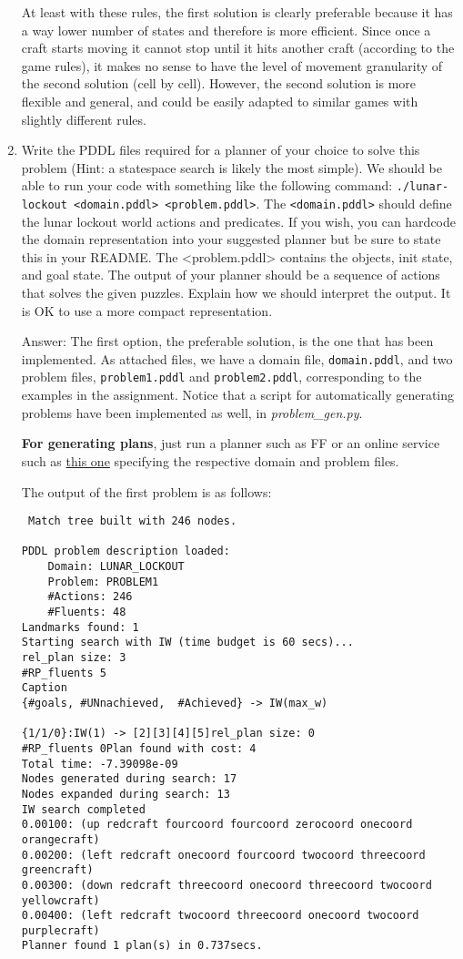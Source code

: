 \documentclass{article}
\begin{document}
\begin{enumerate}
At least with these rules, the first solution is clearly preferable because it has a way lower number of states and therefore is more efficient. Since once a craft starts moving it cannot stop until it hits another craft (according to the game rules), it makes no sense to have the level of movement granularity of the second solution (cell by cell). However, the second solution is more flexible and general, and could be easily adapted to similar games with slightly different rules.

\item
Write the PDDL files required for a planner of your choice to solve this problem (Hint: a statespace search is likely the most simple). We should be able to run your code with something like the following command: \texttt{./lunar-lockout <domain.pddl> <problem.pddl>}. The \texttt{<domain.pddl>} should define the lunar lockout world actions and predicates. If you wish, you can hardcode the domain representation into your suggested planner but be sure to state this in your README. The <problem.pddl> contains the objects, init state, and goal state. The output of your planner should be a sequence of actions that solves the given puzzles. Explain how we should interpret the output. It is OK to use a more compact representation.

Answer:
The first option, the preferable solution, is the one that has been implemented. As attached files, we have a domain file, \texttt{domain.pddl}, and two problem files, \texttt{problem1.pddl} and \texttt{problem2.pddl}, corresponding to the examples in the assignment. Notice that a script for automatically generating problems have been implemented as well, in \textit{problem\_gen.py}.

\textbf{For generating plans}, just run a planner such as FF or an online service such as \color{purple} \href{http://editor.planning.domains}{this one} \color{black} specifying the respective domain and problem files.

The output of the first problem is as follows:
\begin{verbatim}
 Match tree built with 246 nodes.

PDDL problem description loaded: 
	Domain: LUNAR_LOCKOUT
	Problem: PROBLEM1
	#Actions: 246
	#Fluents: 48
Landmarks found: 1
Starting search with IW (time budget is 60 secs)...
rel_plan size: 3
#RP_fluents 5
Caption
{#goals, #UNnachieved,  #Achieved} -> IW(max_w)

{1/1/0}:IW(1) -> [2][3][4][5]rel_plan size: 0
#RP_fluents 0Plan found with cost: 4
Total time: -7.39098e-09
Nodes generated during search: 17
Nodes expanded during search: 13
IW search completed
0.00100: (up redcraft fourcoord fourcoord zerocoord onecoord orangecraft)
0.00200: (left redcraft onecoord fourcoord twocoord threecoord greencraft)
0.00300: (down redcraft threecoord onecoord threecoord twocoord yellowcraft)
0.00400: (left redcraft twocoord threecoord onecoord twocoord purplecraft)
Planner found 1 plan(s) in 0.737secs.
\end{verbatim}


\end{enumerate}
\end{document}
